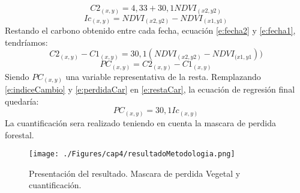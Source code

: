 		\begin{equation}
						\label{e:fecha2}
		C2_{(x,y)}=4,33+30,1 NDVI_{(x2,y2)}
		\end{equation}
		\begin{equation}
		\label{e:indiceCambio}
		Ic_{(x,y)}=NDVI_{(x2,y2)} -NDVI_{(x1,y1)}
		\end{equation}		
Restando el carbono obtenido entre cada fecha, ecuación \ref{e:fecha2} y \ref{e:fecha1}, tendr\'iamos:
		\begin{equation}
				\label{e:restaCar}
		C2_{(x,y)} - C1_{(x,y)}= 30,1(NDVI_{(x2,y2)}-NDVI_{(x1,y1}))
		\end{equation}		
				\begin{equation}
				\label{e:perdidaCar}
					PC_{(x,y)} =C2_{(x,y)} - C1_{(x,y)}
				\end{equation}		
Siendo $ PC_{(x,y)}$ una variable representativa de la resta. Remplazando \ref{e:indiceCambio} y \ref{e:perdidaCar} en \ref{e:restaCar}, la ecuaci\'on de regresi\'on final quedar\'ia:
		\begin{equation}
			PC_{(x,y)} = 30,1 Ic_{(x,y)}
		\end{equation}
La cuantificaci\'on sera realizado teniendo en cuenta la mascara de perdida forestal.
\begin{figure}[H]
	\centering
	\texttt{[image: ./Figures/cap4/resultadoMetodologia.png]}
	\caption{Presentaci\'on del resultado. Mascara de perdida Vegetal y cuantificaci\'on.}
	\label{fig:resulPC}
\end{figure}




